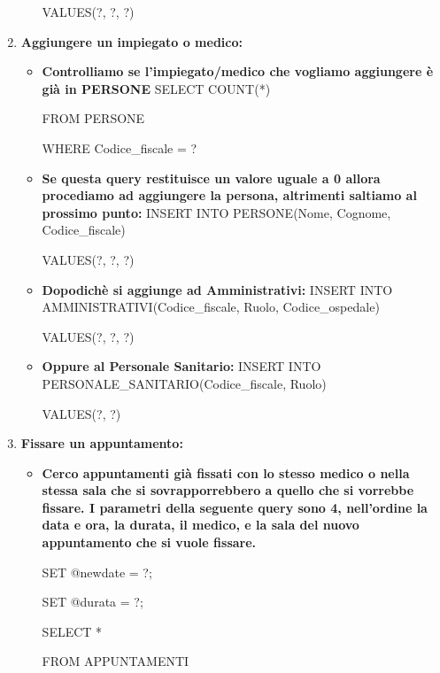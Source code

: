 \documentclass[a4paper,12pt]{report}
\begin{document}
\begin{enumerate}[leftmargin=0cm,itemindent=.5cm,labelwidth=\itemindent,labelsep=0cm,align=left]
\begin{itemize}
        VALUES(?, ?, ?)

    \end{itemize}
    \item \textbf{Aggiungere un impiegato o medico:} 
    \begin{itemize}
        \item \textbf{Controlliamo se l'impiegato/medico che vogliamo aggiungere è già in PERSONE} \newline
        SELECT COUNT(*)

        FROM PERSONE

        WHERE Codice\_fiscale = ?

        \item \textbf{Se questa query restituisce un valore uguale a 0 allora procediamo ad aggiungere la persona, 
        altrimenti saltiamo al prossimo punto:} \newline
        INSERT INTO PERSONE(Nome, Cognome, Codice\_fiscale)

        VALUES(?, ?, ?)

        \item \textbf{Dopodichè si aggiunge ad Amministrativi:} \newline
        INSERT INTO AMMINISTRATIVI(Codice\_fiscale, Ruolo, Codice\_ospedale)

        VALUES(?, ?, ?)

        \item \textbf{Oppure al Personale Sanitario:} \newline
        INSERT INTO PERSONALE\_SANITARIO(Codice\_fiscale, Ruolo)

        VALUES(?, ?)

    \end{itemize}
    \item \textbf{Fissare un appuntamento:} 
    \begin{itemize}
        \item \textbf{Cerco appuntamenti già fissati con lo stesso medico o nella stessa sala che si sovrapporrebbero a quello che si vorrebbe fissare.
        I parametri della seguente query sono 4, nell'ordine la data e ora, la durata, il medico, e la sala del nuovo appuntamento che si vuole fissare.} \newline
        
        SET @newdate = ?;

        SET @durata = ?;

        SELECT *

        FROM APPUNTAMENTI


\end{itemize}
\end{enumerate}
\end{document}
